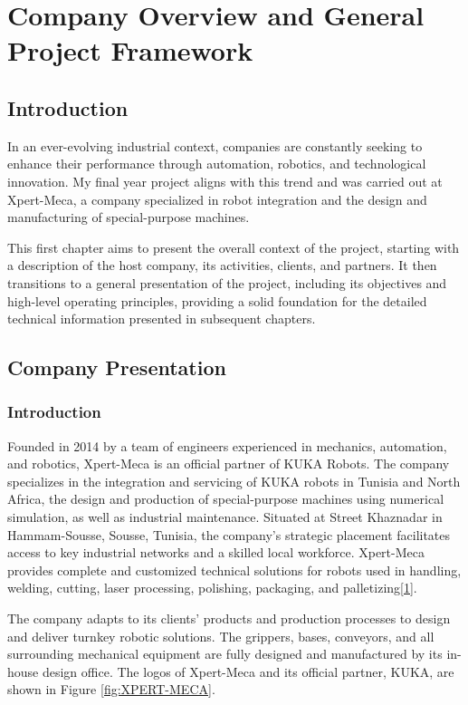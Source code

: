 \chapter{Company Overview and General Project Framework}

\section{Introduction}
In an ever-evolving industrial context, companies are constantly seeking to enhance their performance through automation, robotics, and technological innovation. My final year project aligns with this trend and was carried out at Xpert-Meca, a company specialized in robot integration and the design and manufacturing of special-purpose machines.

This first chapter aims to present the overall context of the project, starting with a description of the host company, its activities, clients, and partners. It then transitions to a general presentation of the project, including its objectives and high-level operating principles, providing a solid foundation for the detailed technical information presented in subsequent chapters.

\section{Company Presentation}
\subsection{Introduction}
Founded in 2014 by a team of engineers experienced in mechanics, automation, and robotics, Xpert-Meca is an official partner of KUKA Robots. The company specializes in the integration and servicing of KUKA robots in Tunisia and North Africa, the design and production of special-purpose machines using numerical simulation, as well as industrial maintenance. Situated at Street Khaznadar in Hammam-Sousse, Sousse, Tunisia, the company's strategic placement facilitates access to key industrial networks and a skilled local workforce. Xpert-Meca provides complete and customized technical solutions for robots used in handling, welding, cutting, laser processing, polishing, packaging, and palletizing\hyperref[sec:bibliography]{[1]}.

The company adapts to its clients' products and production processes to design and deliver turnkey robotic solutions. The grippers, bases, conveyors, and all surrounding mechanical equipment are fully designed and manufactured by its in-house design office. The logos of Xpert-Meca and its official partner, KUKA, are shown in Figure \ref{fig:XPERT-MECA}.

